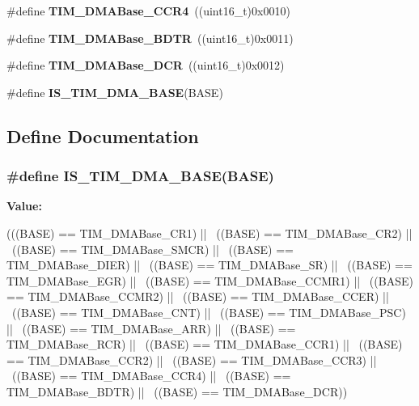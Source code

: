 \begin{DoxyCompactItemize}
\item 
\hypertarget{group__TIM__DMA__Base__address_ga5e84a16e7d8ea369a3a55bb6fe1f2171}{
\#define {\bfseries TIM\_\-DMABase\_\-CCR4}~((uint16\_\-t)0x0010)}
\label{group__TIM__DMA__Base__address_ga5e84a16e7d8ea369a3a55bb6fe1f2171}

\item 
\hypertarget{group__TIM__DMA__Base__address_gaaff22bbf3091c47783c1c68b648c8605}{
\#define {\bfseries TIM\_\-DMABase\_\-BDTR}~((uint16\_\-t)0x0011)}
\label{group__TIM__DMA__Base__address_gaaff22bbf3091c47783c1c68b648c8605}

\item 
\hypertarget{group__TIM__DMA__Base__address_ga59e2206e4e03b9d55c9fb5a24e29b01c}{
\#define {\bfseries TIM\_\-DMABase\_\-DCR}~((uint16\_\-t)0x0012)}
\label{group__TIM__DMA__Base__address_ga59e2206e4e03b9d55c9fb5a24e29b01c}

\item 
\#define {\bfseries IS\_\-TIM\_\-DMA\_\-BASE}(BASE)
\end{DoxyCompactItemize}


\subsection{Define Documentation}
\hypertarget{group__TIM__DMA__Base__address_gaf565551f2619b1368fed7ef1ba7414de}{
\subsubsection[{IS\_\-TIM\_\-DMA\_\-BASE}]{\setlength{\rightskip}{0pt plus 5cm}\#define IS\_\-TIM\_\-DMA\_\-BASE(BASE)}}
\label{group__TIM__DMA__Base__address_gaf565551f2619b1368fed7ef1ba7414de}
{\bfseries Value:}
\begin{DoxyCode}
(((BASE) == TIM_DMABase_CR1) || \
                               ((BASE) == TIM_DMABase_CR2) || \
                               ((BASE) == TIM_DMABase_SMCR) || \
                               ((BASE) == TIM_DMABase_DIER) || \
                               ((BASE) == TIM_DMABase_SR) || \
                               ((BASE) == TIM_DMABase_EGR) || \
                               ((BASE) == TIM_DMABase_CCMR1) || \
                               ((BASE) == TIM_DMABase_CCMR2) || \
                               ((BASE) == TIM_DMABase_CCER) || \
                               ((BASE) == TIM_DMABase_CNT) || \
                               ((BASE) == TIM_DMABase_PSC) || \
                               ((BASE) == TIM_DMABase_ARR) || \
                               ((BASE) == TIM_DMABase_RCR) || \
                               ((BASE) == TIM_DMABase_CCR1) || \
                               ((BASE) == TIM_DMABase_CCR2) || \
                               ((BASE) == TIM_DMABase_CCR3) || \
                               ((BASE) == TIM_DMABase_CCR4) || \
                               ((BASE) == TIM_DMABase_BDTR) || \
                               ((BASE) == TIM_DMABase_DCR))
\end{DoxyCode}
